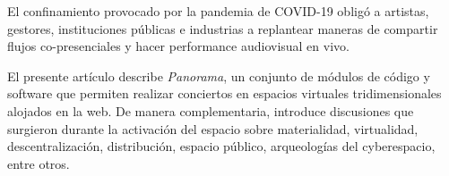 

El confinamiento provocado por la pandemia de COVID-19 obligó a artistas, gestores, instituciones públicas e industrias a replantear maneras de compartir flujos co-presenciales y hacer performance audiovisual en vivo.

El presente artículo describe \textit{Panorama}, un conjunto de módulos de código y software que permiten realizar conciertos en espacios virtuales tridimensionales alojados en la web. De manera complementaria, introduce discusiones que surgieron durante la activación del espacio sobre materialidad, virtualidad, descentralización, distribución, espacio público, arqueologías del cyberespacio, entre otros.                       

